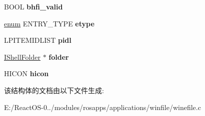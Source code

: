 \begin{DoxyCompactItemize}
\item 
\mbox{\label{struct___entry_ae1532420b58e3e7707a04d5f61ba573a}} 
B\+O\+OL {\bfseries bhfi\+\_\+valid}
\item 
\mbox{\label{struct___entry_a7879997c1af48884d77326ddf19fbdc5}} 
\hyperlink{interfaceenum}{enum} E\+N\+T\+R\+Y\+\_\+\+T\+Y\+PE {\bfseries etype}
\item 
\mbox{\label{struct___entry_a54a58a8b5bac803fd28fda04b7d1978a}} 
L\+P\+I\+T\+E\+M\+I\+D\+L\+I\+ST {\bfseries pidl}
\item 
\mbox{\label{struct___entry_a77e048cfcb14f5b83b39750e65379a6b}} 
\hyperlink{interface_i_shell_folder}{I\+Shell\+Folder} $\ast$ {\bfseries folder}
\item 
\mbox{\label{struct___entry_a47256ab7e1b51711685466ad8e1cbd89}} 
H\+I\+C\+ON {\bfseries hicon}
\end{DoxyCompactItemize}


该结构体的文档由以下文件生成\+:\begin{DoxyCompactItemize}
\item 
E\+:/\+React\+O\+S-\/0../modules/rosapps/applications/winfile/winefile.\+c\end{DoxyCompactItemize}
